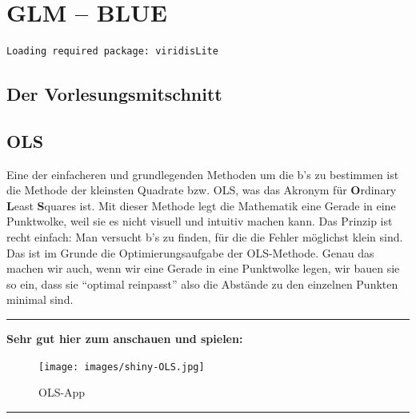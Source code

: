 \documentclass[
  10pt,
  letterpaper,
  a4paper, twoside]{scrreprt}
\begin{document}

\chapter{GLM -- BLUE}\label{glm-blue}

\begin{verbatim}
Loading required package: viridisLite
\end{verbatim}

\section*{Der Vorlesungsmitschnitt}\label{der-vorlesungsmitschnitt-2}


\section{OLS}\label{ols}

Eine der einfacheren und grundlegenden Methoden um die b's zu bestimmen
ist die Methode der kleinsten Quadrate bzw. OLS, was das Akronym für
\textbf{O}rdinary \textbf{L}east \textbf{S}quares ist. Mit dieser
Methode legt die Mathematik eine Gerade in eine Punktwolke, weil sie es
nicht visuell und intuitiv machen kann. Das Prinzip ist recht einfach:
Man versucht b's zu finden, für die die Fehler möglichst klein sind. Das
ist im Grunde die Optimierungsaufgabe der OLS-Methode. Genau das machen
wir auch, wenn wir eine Gerade in eine Punktwolke legen, wir bauen sie
so ein, dass sie \enquote{optimal reinpasst} also die Abstände zu den
einzelnen Punkten minimal sind.

\begin{center}\rule{0.5\linewidth}{0.5pt}\end{center}

\textbf{Sehr gut hier zum anschauen und spielen:}

\begin{figure}[H]

{\centering \texttt{[image: images/shiny-OLS.jpg]}

}

\caption{OLS-App}

\end{figure}%

\begin{center}\rule{0.5\linewidth}{0.5pt}\end{center}
\end{document}
